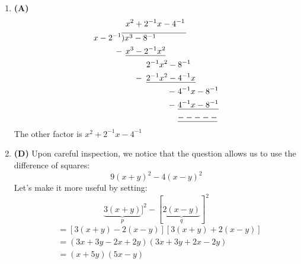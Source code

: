 \begin{multicols}{2}
\begin{enumerate}[label={\textbf{\arabic*.}}]
    \item \textbf{(A)} \begin{align*} 
        & \hspace{5pt} x^ 2 + 2^{-1}x -4^{-1} \\ \vspace{-20pt} 
        x - 2^{-1}& \overline{)x^3 - 8^{-1} \hspace{.5in}} \\
        -\hspace{-1pt} & \hspace{5pt} \underline{x^3 - 2^{-1}x^2} \\
        & \hspace{30pt} 2^{-1}x^2 - 8^{-1} \\
        -\hspace{-25pt} & \hspace{30pt} \underline{2^{-1}x^2 - 4^{-1}x} \\
       -\hspace{-65pt} & \hspace{68pt} 4^{-1}x - 8^{-1} \\
       -\hspace{-65pt} & \hspace{68pt} \underline{4^{-1}x - 8^{-1} } \\
       & \hspace{68pt} \underline{-----} 
    \end{align*}
    The other factor is $x^ 2 + 2^{-1}x -4^{-1}$

    \item \textbf{(D)} Upon careful inspection, we notice that the question allows us to use the difference of squares:
        \[9(x + y)^2 - 4(x - y)^2\]
        Let's make it more useful by setting:
        \[\underbrace{3(x + y)}_{p}]^2 - [\underbrace{2(x - y)}_{q}]^2\]
        \begin{align*}
            & = \left[3(x + y) - 2(x - y)\right]\left[3(x + y) + 2(x - y)\right] \\
            & = \left(3x + 3y - 2x + 2y\right)\left(3x + 3y + 2x - 2y\right) \\
            & = (x + 5y)(5x - y)
        \end{align*}
    


\end{enumerate}
\end{multicols}
